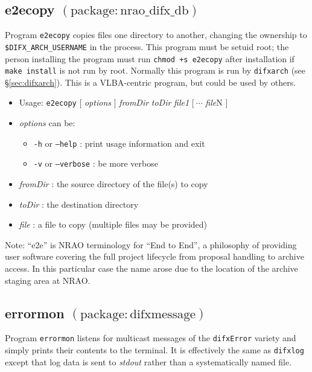 \subsection{e2ecopy {\small $\mathrm{(package: nrao\_difx\_db)}$}} \label{sec:e2ecopy}

Program {\tt e2ecopy} copies files one directory to another, changing the ownership to 
{\tt \$DIFX\_ARCH\_USERNAME} in the process.
This program must be setuid root; the person installing the program must run {\tt chmod +s e2ecopy} after installation if {\tt make install} is not run by root.
Normally this program is run by {\tt difxarch} (see \S\ref{sec:difxarch}).
This is a VLBA-centric program, but could be used by others.

\begin{itemize}
\item[] Usage: {\tt e2ecopy} $[$ {\em options} $]$ {\em fromDir} {\em toDir} {\em file1} $[\ \cdots$ {\em file}N $]$
\item[] {\em options} can be:
\begin{itemize}
\item[] {\tt -h} or {\tt --help} : print usage information and exit
\item[] {\tt -v} or {\tt --verbose} : be more verbose
\end{itemize}
\item[] {\em fromDir} : the source directory of the file(s) to copy
\item[] {\em toDir} : the destination directory
\item[] {\em file} : a file to copy (multiple files may be provided)
\end{itemize}

\noindent
Note: ``e2e'' is NRAO terminology for ``End to End'', a philosophy of providing user software covering the full project lifecycle from proposal handling to archive access.
In this particular case the name arose due to the location of the archive staging area at NRAO.






\subsection{errormon {\small $\mathrm{(package: difxmessage)}$}} \label{sec:errormon} 

Program {\tt errormon} listens for multicast messages of the {\tt difxError} variety and simply prints their contents to the terminal.
It is effectively the same as {\tt difxlog} except that log data is sent to {\em stdout} rather than a systematically named file.


